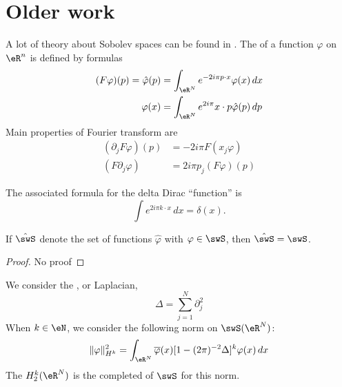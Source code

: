 \section{Older work}
\label{SECooNJLDooFcUzQv}

A lot of theory about Sobolev spaces can be found in \cite{Maslov,Taylor_PDO}. The  of a function $\varphi$ on $\eR^n$ is defined by formulas
\begin{subequations}
\begin{align}
  (F\varphi)(p)=\hat\varphi(p)&=\int_{\eR^N} e^{-2i\pi p\cdot x}\varphi(x)\,dx\\
	\varphi(x)&=\int_{\eR^{N}} e^{2i\pi}x\cdot p\hat\varphi(p)\,dp
\end{align}
\end{subequations}
Main properties of Fourier transform are
\begin{subequations} \label{subeq_prop_Four}
\begin{align}
(\partial_jF\varphi)(p)&=-2i\pi F(x_j\varphi)\\
	(F\partial_j\varphi)&=2i\pi p_j(F\varphi)(p)
\end{align}
\end{subequations}

The associated formula for the delta Dirac ``function'' is 
\begin{equation}
  \int e^{2i\pi k\cdot x}\,dx=\delta(x).
\end{equation}

\begin{proposition}
If $\hat\swS$ denote the set of functions $\hat\varphi$ with $\varphi\in\swS$, then $\hat\swS=\swS$. 
\end{proposition}

\begin{proof}
No proof
\end{proof}

We consider the , or Laplacian,
\begin{equation}
\Delta=\sum_{j=1}^{N}\partial_j^2
\end{equation}
When $k\in\eN$, we consider the following norm on $\swS(\eR^N)$:
\begin{equation} \label{eq_def_norm_Sob}
  \| \varphi \|_{H^k}^2=\int_{\eR^N}\overline{\varphi}(x)[1-(2\pi)^{-2}\Delta]^k\varphi(x)\,dx
\end{equation}
The  $H^k_2(\eR^N)$ is the completed of $\swS$ for this norm.


